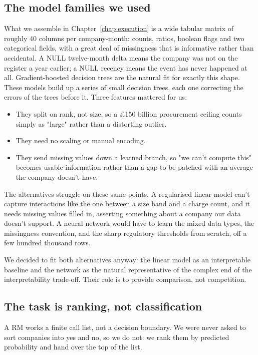 \documentclass[    author={Samuel Menon Demelo; Sneha Saphala Ram Prasad; 
Viktor Ander Lindholm; Vishal Khatri},
               supervisor={Prof. Fernando Moreno-Pino},
                   degree={MSc},
                    title={Lloyds Commercial Banking Intelligence},
                 subtitle={Ranking SME Lending, Risk and Growth Prospects for Lloyds Banking Group},
                     type={},
                     year={2026}]{dissertation}
\begin{document}
\subsection{The model families we used}
What we assemble in Chapter~\ref{chap:execution} is a wide tabular matrix of roughly 40 columns per company-month: counts, ratios, boolean flags and two categorical fields, with a great deal of missingness that is informative rather than accidental. A NULL twelve-month delta means the company was not on the register a year earlier; a NULL recency means the event has never happened at all. Gradient-boosted decision trees \cite{4a848dd1-54e3-3c3c-83c3-04977ded2e71, ke2017lightgbm} are the natural fit for exactly this shape. These models build up a series of small decision trees, each one correcting the errors of the trees before it. Three features mattered for us:
\begin{itemize}
    \item They split on rank, not size, so a £150 billion procurement ceiling counts simply as "large" rather than a distorting outlier.
    \item They need no scaling or manual encoding.
    \item They send missing values down a learned branch, so "we can't compute this" becomes usable information rather than a gap to be patched with an average the company doesn't have.
\end{itemize}
   The alternatives struggle on these same points. A regularised linear model can't capture interactions like the one between a size band and a charge count, and it needs missing values filled in, asserting something about a company our data doesn't support. A neural network would have to learn the mixed data types, the missingness convention, and the sharp regulatory thresholds from scratch, off a few hundred thousand rows.

   We decided to fit both alternatives anyway: the linear model as an interpretable baseline and the network as the natural representative of the complex end of the interpretability trade-off. Their role is to provide comparison, not competition.

\subsection{The task is ranking, not classification}
A RM works a finite call list, not a decision boundary. We were never asked to sort companies into yes and no, so we do not: we rank them by predicted probability and hand over the top of the list.
\end{document}
